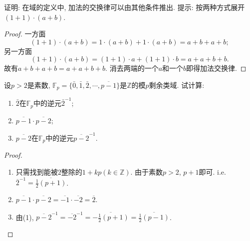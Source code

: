 \begin{problem}\label{ex:1.1.5}
    证明: 在域的定义中, 加法的交换律可以由其他条件推出. 提示: 按两种方式展开$(1 + 1) \cdot (a + b)$.
\end{problem}

\begin{proof}
    一方面
    \[
        (1 + 1) \cdot (a + b) = 1 \cdot (a + b) + 1 \cdot (a + b) = a + b + a + b;
    \]
    另一方面
    \[
        (1 + 1) \cdot (a + b) = (1 + 1) \cdot a + (1 + 1) \cdot b = a + a + b + b.
    \]
    故有$a + b + a + b = a + a + b + b$. 消去两端的一个$a$和一个$b$即得加法交换律.
\end{proof}

\begin{problem}
    设$p > 2$是素数, $\mathbb{F}_p = \{\bar{0}, \bar{1}, \bar{2}, \cdots, \overline{p-1}\}$是$\mathbb{Z}$的模$p$剩余类域. 试计算:
    \begin{enumerate}[(1)]
        \item $\bar{2}$在$\mathbb{F}_p$中的逆元$\bar{2}^{-1}$;
        \item $\overline{p - 1} \cdot \overline{p - 2}$;
        \item $\overline{p - 2}$在$\mathbb{F}_p$中的逆元$\overline{p-2}^{-1}$.
    \end{enumerate}
\end{problem}

\begin{proof}
    \begin{enumerate}[(1)]
        \item 只需找到能被$2$整除的$1 + kp(k \in \mathbb{Z})$. 由于素数$p > 2$, $p + 1$即可. i.e. $\overline{2}^{-1} = \overline{\frac12(p + 1)}$.
        \item $\overline{p - 1} \cdot \overline{p - 2} = \overline{-1} \cdot \overline{-2} = \overline{2}$.
        \item 由(1), $\overline{p - 2}^{-1} = \overline{-2}^{-1} = \overline{-\frac12(p + 1)} = \overline{\frac12(p - 1)}$.
    \end{enumerate}
\end{proof}
    